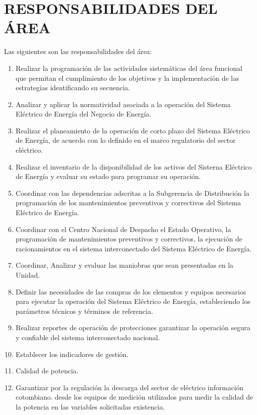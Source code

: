 \documentclass[a5paper]{book}%
\begin{document}
  \section{RESPONSABILIDADES DEL ÁREA}

  Las siguientes son las responsabilidades del área:\\
  
  \begin{enumerate}
  \item Realizar la programación de las actividades sistemáticas del área funcional que permitan
 el cumplimiento de los objetivos y la implementación de las estrategias identificando su secuencia.
\item Analizar y aplicar la normatividad asociada a la operación del Sistema Eléctrico de Energía
 del Negocio de Energía.
\item Realizar el planeamiento de la operación de corto plazo del Sistema Eléctrico  de Energía, de acuerdo con lo definido en el marco regulatorio del sector eléctrico.
\item Realizar el inventario de la disponibilidad de los activos del Sisterna Eléctrico  de Energía y evaluar su estado para programar su  operación.
\item Coordinar con las dependencias adscritas a la Subgerencia de Distribución  la programación de los mantenimientos preventivos y correctivos del Sistema Eléctrico de Energía.
\item Coordinar con el Centro Nacional de Despacho el Estado  Operativo, la programación de mantenimientos preventivos y correctivos, la ejecución de racionamientos en el sistema interconectado del Sistema Eléctrico de Energía.
\item Coordinar, Analizar y evaluar las maniobras que sean presentadas en la Unidad.
\item Definir las necesidades de las compras de los elementos y equipos necesarios para ejecutar la operación del Sistema Eléctrico de Energía, estableciendo los parámetros  técnicos y términos de referencia.
\item Realizar  reportes de operación  de protecciones garantizar la operación  segura y confiable del sistema interconectado nacional.
\item Establecer los indicadores de gestión.
\item Calidad de potencia.
\item Garantizar por la regulación la descarga del sector de eléctrico información cotombiano.  desde los equipos de medición  utilizados para medir la calidad de la potencia en las variables solicitadas existencia.

\end{enumerate}
\end{document}
